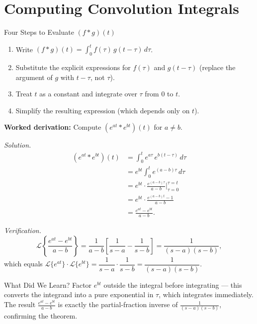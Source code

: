 \documentclass[12pt,a4paper]{article}
\begin{document}
\section{Computing Convolution Integrals}

\begin{infobox}{Four Steps to Evaluate $(f * g)(t)$}
\begin{enumerate}[label=\textbf{Step \arabic*.}]
\item Write $\displaystyle(f*g)(t) = \int_0^t f(\tau)\,g(t-\tau)\,d\tau$.
\item Substitute the explicit expressions for $f(\tau)$ and $g(t-\tau)$
      (replace the argument of $g$ with $t-\tau$, not $\tau$).
\item Treat $t$ as a constant and integrate over $\tau$ from $0$ to $t$.
\item Simplify the resulting expression (which depends only on $t$).
\end{enumerate}
\end{infobox}

\medskip
\textbf{Worked derivation:} Compute $(e^{at} * e^{bt})(t)$ for $a \neq b$.

\textit{Solution.}
\begin{align*}
(e^{at} * e^{bt})(t)
  &= \int_0^t e^{a\tau}\,e^{b(t-\tau)}\,d\tau \\
  &= e^{bt} \int_0^t e^{(a-b)\tau}\,d\tau \\
  &= e^{bt} \cdot \frac{e^{(a-b)\tau}}{a-b}\Bigg|_{\tau=0}^{\tau=t} \\
  &= e^{bt} \cdot \frac{e^{(a-b)t} - 1}{a-b} \\
  &= \frac{e^{at} - e^{bt}}{a-b}.
\end{align*}

\textit{Verification.}
\[
  \mathcal{L}\!\left\{\frac{e^{at}-e^{bt}}{a-b}\right\}
    = \frac{1}{a-b}\left[\frac{1}{s-a} - \frac{1}{s-b}\right]
    = \frac{1}{(s-a)(s-b)},
\]
which equals $\mathcal{L}\{e^{at}\}\cdot\mathcal{L}\{e^{bt}\}
= \dfrac{1}{s-a}\cdot\dfrac{1}{s-b} = \dfrac{1}{(s-a)(s-b)}$. \checkmark

\begin{learnbox}{What Did We Learn?}
Factor $e^{bt}$ outside the integral before integrating --- this converts the
integrand into a pure exponential in $\tau$, which integrates immediately. The
result $\frac{e^{at}-e^{bt}}{a-b}$ is exactly the partial-fraction inverse of
$\frac{1}{(s-a)(s-b)}$, confirming the theorem.
\end{learnbox}
\end{document}
